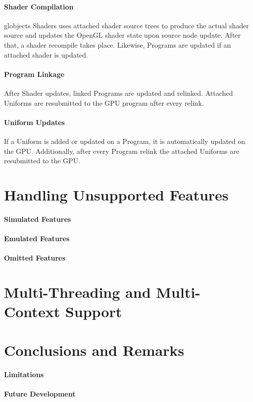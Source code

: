 \documentclass{article}
\begin{document}
\paragraph{Shader Compilation}

globjects Shaders uses attached shader source trees to produce the actual shader source and updates the OpenGL shader state upon source node update.
After that, a shader recompile takes place.
Likewise, Programs are updated if an attached shader is updated.

\paragraph{Program Linkage}

After Shader updates, linked Programs are updated and relinked.
Attached Uniforms are resubmitted to the GPU program after every relink.

\paragraph{Uniform Updates}

If a Uniform is added or updated on a Program, it is automatically updated on the GPU.
Additionally, after every Program relink the attached Uniforms are resubmitted to the GPU.

\section{Handling Unsupported Features}


\paragraph{Simulated Features}


\paragraph{Emulated Features}


\paragraph{Omitted Features}



\section{Multi-Threading and Multi-Context Support}


\section{Conclusions and Remarks}

\paragraph{Limitations}

\paragraph{Future Development}
\end{document}
